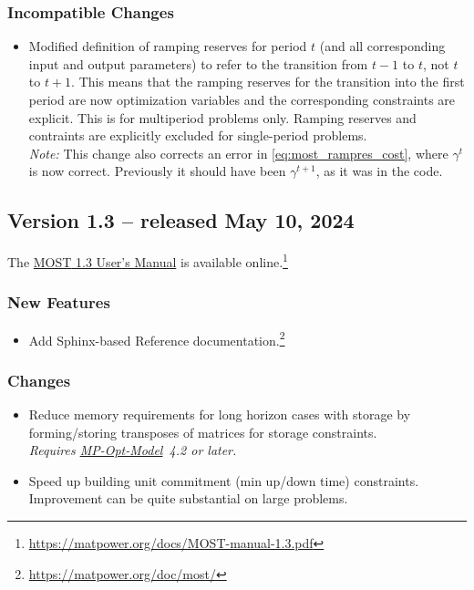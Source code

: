 \documentclass[12pt]{article}
\newcommand{\mpom}[0]{\mbox{MP-Opt-Model}}
\newcommand{\mpomurl}[0]{https://github.com/MATPOWER/mp-opt-model}
\newcommand{\mpomlink}[0]{\href{\mpomurl}{\mpom{}}}
\newcommand{\most}[0]{{MOST}}
\numberwithin{equation}{section}
\numberwithin{table}{section}
\numberwithin{figure}{section}
\begin{document}
\begin{appendices}
\subsubsection*{Incompatible Changes}
\begin{itemize}
\item Modified definition of ramping reserves for period $t$ (and all
corresponding input and output parameters) to refer to the transition
from $t-1$ to $t$, not $t$ to $t+1$. This means that the ramping
reserves for the transition into the first period are now optimization
variables and the corresponding constraints are explicit. This is for
multiperiod problems only. Ramping reserves and contraints are explicitly
excluded for single-period problems.\\
\emph{Note:} This change also corrects an error in
\eqref{eq:most_rampres_cost}, where $\gamma^t$ is now correct.
Previously it should have been $\gamma^{t+1}$, as it was in the code.
\end{itemize}


\subsection{Version 1.3 -- released May 10, 2024}
\label{app:v13}

The \href{https://matpower.org/docs/MOST-manual-1.3.pdf}{\most{} 1.3 User's Manual} is available online.\footnote{\url{https://matpower.org/docs/MOST-manual-1.3.pdf}}

\subsubsection*{New Features}
\begin{itemize}
\item Add Sphinx-based Reference documentation.\footnote{\url{https://matpower.org/doc/most/}}
\end{itemize}

\subsubsection*{Changes}
\begin{itemize}
\item Reduce memory requirements for long horizon cases with storage by forming/storing transposes of matrices for storage constraints.\\
\emph{Requires \mpomlink{}~4.2 or later.}
\item Speed up building unit commitment (min up/down time) constraints. Improvement can be quite substantial on large problems.


\end{itemize}
\end{appendices}
\end{document}

